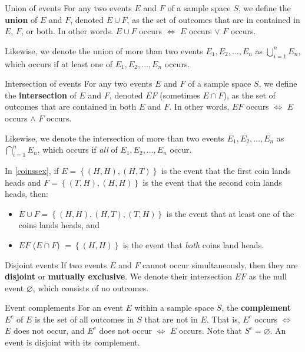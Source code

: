 \begin{bdef}{Union of events}\label{unionev}
    For any two events $E$ and $F$ of a sample space $S$, we define the \textbf{union} of $E$ and $F$, denoted $E \cup F$, as the set of outcomes that are in contained in $E$, $F$, or both. In other words. $E \cup F$ occurs $\iff$ $E$ occurs $\vee$ $F$ occurs.

    Likewise, we denote the union of more than two events $E_1, E_2, \dots, E_n$ as $\bigcup^n_{i=1}E_n$, which occurs if at least one of $E_1, E_2, \dots, E_n$ occurs.
\end{bdef}
\begin{bdef}{Intersection of events}\label{intev}
    For any two events $E$ and $F$ of a sample space $S$, we define the \textbf{intersection} of $E$ and $F$, denoted $EF$ (sometimes $E \cap F$), as the set of outcomes that are contained in both $E$ and $F$. In other words, $EF$ occurs $\iff$ $E$ occurs $\wedge$ $F$ occurs.

    Likewise, we denote the intersection of more than two events $E_1, E_2, \dots, E_n$ as $\bigcap^n_{i=1}E_n$, which occurs if \emph{all} of $E_1, E_2, \dots, E_n$ occur.
\end{bdef}

\begin{changebar}    
    \begin{example}\label{coinuiex}
        In \autoref{coinssex}, if $E = \left\{ (H, H), (H, T) \right\}$ is the event that the first coin lands heads and $F = \left\{ (T, H), (H, H) \right\}$ is the event that the second coin lands heads, then: \begin{itemize}
            \item $E \cup F = \left\{ (H, H), (H, T), (T, H) \right\}$ is the event that at least one of the coins lands heads, and
            \item $EF$ ($E \cap F$) $= \left\{ (H, H) \right\}$ is the event that \emph{both} coins land heads.
        \end{itemize}
    \end{example}
\end{changebar}

\begin{bdef}{Disjoint events}\label{disjev}
    If two events $E$ and $F$ cannot occur simultaneously, then they are \textbf{disjoint} or \textbf{mutually exclusive}. We denote their intersection $EF$ as the null event $\varnothing$, which consists of no outcomes.
\end{bdef}
\begin{bdef}{Event complements}\label{compev}
     For an event $E$ within a sample space $S$, the \textbf{complement} $E^c$ of $E$ is the set of all outcomes in $S$ that are not in $E$. That is, $E^c$ occurs $\iff$ $E$ does not occur, and $E^c$ does not occur $\iff$ $E$ occurs. Note that $S^c = \varnothing$. An event is disjoint with its complement.
\end{bdef}
\pagebreak
